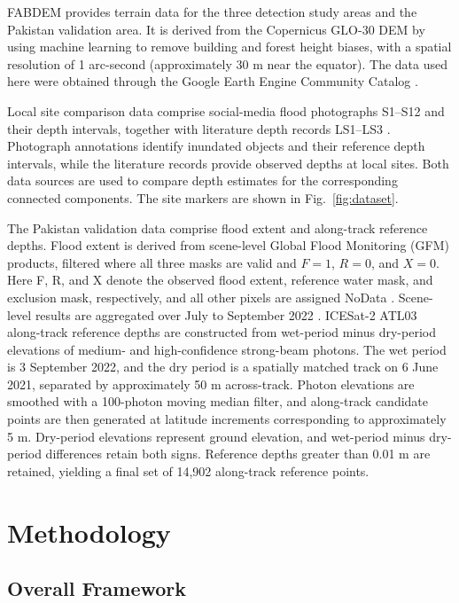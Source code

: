 \documentclass[authoryear,preprint,12pt]{elsarticle}
\begin{document}


FABDEM provides terrain data for the three detection study areas and the Pakistan validation area. It is derived from the Copernicus GLO-30 DEM by using machine learning to remove building and forest height biases, with a spatial resolution of 1 arc-second (approximately 30 m near the equator). The data used here were obtained through the Google Earth Engine Community Catalog \citep{hawker2022fabdem,fabdemGEE}.

Local site comparison data comprise social-media flood photographs S1--S12 and their depth intervals, together with literature depth records LS1--LS3 \citep{zhang2024yolomaskrcnn}. Photograph annotations identify inundated objects and their reference depth intervals, while the literature records provide observed depths at local sites. Both data sources are used to compare depth estimates for the corresponding connected components. The site markers are shown in Fig.~\ref{fig:dataset}.

The Pakistan validation data comprise flood extent and along-track reference depths. Flood extent is derived from scene-level Global Flood Monitoring (GFM) products, filtered where all three masks are valid and \(F=1\), \(R=0\), and \(X=0\). Here F, R, and X denote the observed flood extent, reference water mask, and exclusion mask, respectively, and all other pixels are assigned NoData \citep{gfm2025pum}. Scene-level results are aggregated over July to September 2022 \citep{betterle2024water}. ICESat-2 ATL03 along-track reference depths are constructed from wet-period minus dry-period elevations of medium- and high-confidence strong-beam photons. The wet period is 3 September 2022, and the dry period is a spatially matched track on 6 June 2021, separated by approximately 50 m across-track. Photon elevations are smoothed with a 100-photon moving median filter, and along-track candidate points are then generated at latitude increments corresponding to approximately 5 m. Dry-period elevations represent ground elevation, and wet-period minus dry-period differences retain both signs. Reference depths greater than 0.01 m are retained, yielding a final set of 14,902 along-track reference points.

\begingroup
\section{Methodology}\label{sec:methodology}

\subsection{Overall Framework}\label{sec:overview}
\end{document}
